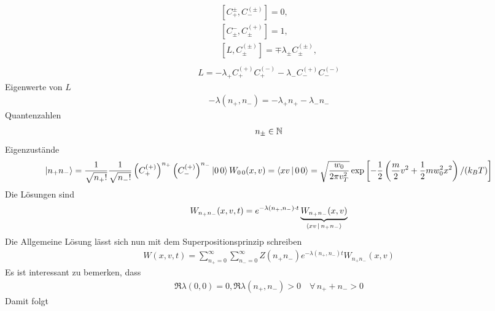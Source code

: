\begin{itemize}
\begin{description}
\begin{align*}
          \left[ C_+^{ \pm }, C_-^{( \pm)} \right] = 0, \\
          \left[ C_\pm^{ - }, C_\pm^{( + )} \right] = 1, \\
          \left[ L , C_\pm^{( \pm)} \right] = \mp \lambda_{\pm} C_\pm^{( \pm )}, \\
        \end{align*}
        \begin{align*}
          L = - \lambda_+ C_+^{(+)}C_+^{(-)} - \lambda_- C_-^{(+)} C_-^{(-)}
        \end{align*}
        Eigenwerte von $L$
        \begin{align*}
           - \lambda(n_+, n_-) = - \lambda_+ n_+ - \lambda_- n_-
        \end{align*}
        Quantenzahlen
        \begin{align*}
          n_\pm \in \mathbb{N}
        \end{align*}
        Eigenzustände
        \begin{align*}
          \Ket{n_+ n_-} = \frac{1}{\sqrt{n_+!}} \frac{1}{\sqrt{n_-!}}
          \left( C_+^{(+)} \right)^{n_+}\left( C_-^{(+)} \right)^{n_-} \Ket{0 \, 0}
          W_{0 \, 0}(x, v) = \Braket{ x v | 0 \, 0} = \sqrt{\frac{w_0}{2 \pi v_T^2}}
          \exp\left[
            - \frac{1}{2} \left( \frac{m}{2} v^2 + \frac{1}{2} m w_0^2 x^2 \right)/(k_B T)
          \right]
        \end{align*}
        Die Lösungen sind
        \begin{align*}
          W_{n_+ n_-} (x, v, t) = e^{-\lambda(n_+, n_-) \cdot t} \underbrace{W_{n_+ n_-}(x, v)}_{\Braket{x v | n_+ n_-}}
        \end{align*}
        Die Allgemeine Lösung lässt sich nun mit dem Superpositionsprinzip schreiben
        \begin{align*}
          W(x, v, t) = \sum_{n_+ = 0}^{\infty} \sum_{n_- = 0}^{\infty}
          Z(n_+ n_-) e^{-\lambda(n_+, n_-) t} W_{n_+ n_-}(x, v)
        \end{align*}
        Es ist interessant zu bemerken, dass
        \begin{align*}
          \Re \lambda (0, 0) = 0, \Re \lambda(n_+, n_-) > 0 \quad\forall\, n_+ + n_- > 0
        \end{align*}
        Damit folgt
        \begin{align*}

\end{align*}
\end{description}
\end{itemize}
